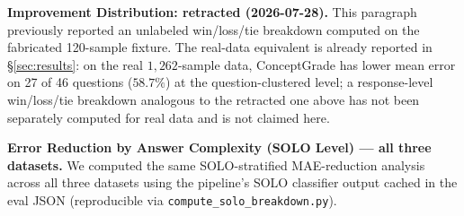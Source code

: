 \documentclass[conference]{IEEEtran}
\begin{document}
\textbf{Improvement Distribution: retracted (2026-07-28).} This
paragraph previously reported an unlabeled win/loss/tie breakdown
computed on the fabricated 120-sample fixture. The real-data equivalent
is already reported in \S\ref{sec:results}: on the real
$1{,}262$-sample data,
ConceptGrade has lower mean error on 27 of 46 questions ($58.7\%$) at
the question-clustered level; a response-level win/loss/tie breakdown
analogous to the retracted one above has not been separately computed
for real data and is not claimed here.

\textbf{Error Reduction by Answer Complexity (SOLO Level) --- all three datasets.}
We computed the same SOLO-stratified MAE-reduction analysis across all three
datasets using the pipeline's SOLO classifier output cached in the eval JSON
(reproducible via \texttt{compute\_solo\_breakdown.py}).
\end{document}
